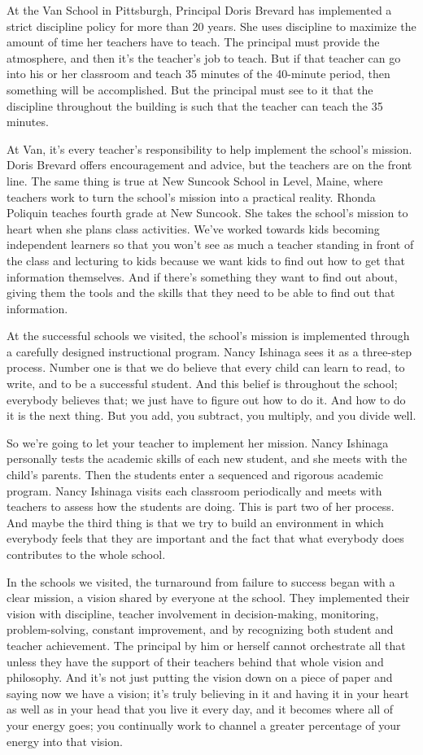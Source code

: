 At the Van School in Pittsburgh, Principal Doris Brevard has implemented a strict discipline policy for more than 20 years.
She uses discipline to maximize the amount of time her teachers have to teach.
The principal must provide the atmosphere, and then it's the teacher's job to teach.
But if that teacher can go into his or her classroom and teach 35 minutes of the 40-minute period, then something will be accomplished.
But the principal must see to it that the discipline throughout the building is such that the teacher can teach the 35 minutes.

At Van, it's every teacher's responsibility to help implement the school's mission.
Doris Brevard offers encouragement and advice, but the teachers are on the front line.
The same thing is true at New Suncook School in Level, Maine, where teachers work to turn the school's mission into a practical reality.
Rhonda Poliquin teaches fourth grade at New Suncook.
She takes the school's mission to heart when she plans class activities.
We've worked towards kids becoming independent learners so that you won't see as much a teacher standing in front of the class and lecturing to kids because we want kids to find out how to get that information themselves.
And if there's something they want to find out about, giving them the tools and the skills that they need to be able to find out that information.

At the successful schools we visited, the school's mission is implemented through a carefully designed instructional program.
Nancy Ishinaga sees it as a three-step process.
Number one is that we do believe that every child can learn to read, to write, and to be a successful student.
And this belief is throughout the school; everybody believes that; we just have to figure out how to do it.
And how to do it is the next thing.
But you add, you subtract, you multiply, and you divide well.

So we're going to let your teacher to implement her mission.
Nancy Ishinaga personally tests the academic skills of each new student, and she meets with the child's parents.
Then the students enter a sequenced and rigorous academic program.
Nancy Ishinaga visits each classroom periodically and meets with teachers to assess how the students are doing.
This is part two of her process.
And maybe the third thing is that we try to build an environment in which everybody feels that they are important and the fact that what everybody does contributes to the whole school.

In the schools we visited, the turnaround from failure to success began with a clear mission, a vision shared by everyone at the school.
They implemented their vision with discipline, teacher involvement in decision-making, monitoring, problem-solving, constant improvement, and by recognizing both student and teacher achievement.
The principal by him or herself cannot orchestrate all that unless they have the support of their teachers behind that whole vision and philosophy.
And it's not just putting the vision down on a piece of paper and saying now we have a vision; it's truly believing in it and having it in your heart as well as in your head that you live it every day, and it becomes where all of your energy goes; you continually work to channel a greater percentage of your energy into that vision.